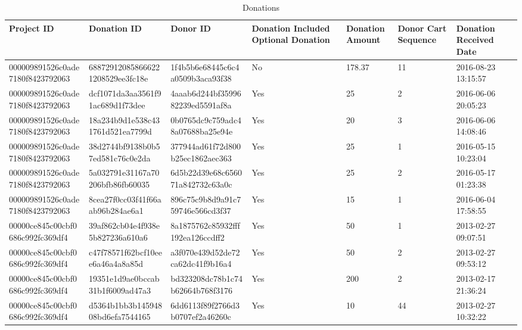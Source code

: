 \documentclass[12pt,a4paper]{article}
\begin{document}
\begin{table}[!htb]
\begin{tabularx}{1.1\textwidth}{XXXXXXX}
Project ID                       & Donation ID                      & Donor ID                         & Donation Included Optional Donation & Donation Amount & Donor Cart Sequence & Donation Received Date \\ \hline
000009891526c0ade7180f8423792063 & 688729120858666221208529ee3fc18e & 1f4b5b6e68445c6c4a0509b3aca93f38 & No                                  & 178.37          & 11                  & 2016-08-23 13:15:57    \\
000009891526c0ade7180f8423792063 & dcf1071da3aa3561f91ac689d1f73dee & 4aaab6d244bf3599682239ed5591af8a & Yes                                 & 25              & 2                   & 2016-06-06 20:05:23    \\
000009891526c0ade7180f8423792063 & 18a234b9d1e538c431761d521ea7799d & 0b0765dc9c759adc48a07688ba25e94e & Yes                                 & 20              & 3                   & 2016-06-06 14:08:46    \\
000009891526c0ade7180f8423792063 & 38d2744bf9138b0b57ed581c76c0e2da & 377944ad61f72d800b25ec1862aec363 & Yes                                 & 25              & 1                   & 2016-05-15 10:23:04    \\
000009891526c0ade7180f8423792063 & 5a032791e31167a70206bfb86fb60035 & 6d5b22d39e68c656071a842732c63a0c & Yes                                 & 25              & 2                   & 2016-05-17 01:23:38    \\
000009891526c0ade7180f8423792063 & 8cea27f0cc03f41f66aab96b284ae6a1 & 896c75c9b8d9a91c759746e566cd3f37 & Yes                                 & 15              & 1                   & 2016-06-04 17:58:55    \\
00000ce845c00cbf0686c992fc369df4 & 39af862cb04e4f938e5b827236a610a6 & 8a1875762c85932fff192ea126ccdff2 & Yes                                 & 50              & 1                   & 2013-02-27 09:07:51    \\
00000ce845c00cbf0686c992fc369df4 & c47f78571f62bcf10eee6a46a4a8a85d & a3f070e439d52de72ca62dc41f9b16a4 & Yes                                 & 50              & 2                   & 2013-02-27 09:53:12    \\
00000ce845c00cbf0686c992fc369df4 & 19351e1d9ae0bccab31b1f6009ad47a3 & bd323208dc78b1c74b62664b768f3176 & Yes                                 & 200             & 2                   & 2013-02-17 21:36:24    \\
00000ce845c00cbf0686c992fc369df4 & d5364b1bb3b14594808bd6efa7544165 & 6dd6113f89f2766d3b0707ef2a46260c & Yes                                 & 10              & 44                  & 2013-02-27 10:32:22   
\end{tabularx}
\caption{Donations}
\end{table}
\pagebreak
\end{document}
